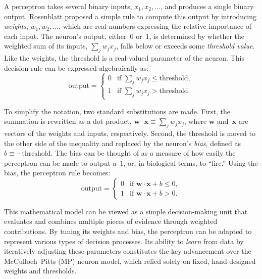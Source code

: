 A perceptron takes several binary inputs, $x_1, x_2, \dots$, and produces a
single binary output.
Rosenblatt proposed a simple rule to compute this output by introducing
\textit{weights}, $w_1, w_2, \dots$, which are real numbers expressing the
relative importance of each input.
The neuron's output, either~$0$ or~$1$, is determined by whether the weighted
sum of its inputs, $\sum_j w_j x_j$, falls below or exceeds some
\textit{threshold value}.
Like the weights, the threshold is a real-valued parameter of the neuron.
This decision rule can be expressed algebraically as:
\begin{equation}
\label{eq:perceptron-threshold}
\text{output} = 
\begin{cases} 
0 & \text{if } \sum_j w_j x_j \le \text{threshold}, \\ 
1 & \text{if } \sum_j w_j x_j > \text{threshold}. 
\end{cases}
\end{equation}

To simplify the notation, two standard substitutions are made.
First, the summation is rewritten as a dot product,
$\mathbf{w} \cdot \mathbf{x} \equiv \sum_j w_j x_j$, where $\mathbf{w}$
and~$\mathbf{x}$ are vectors of the weights and inputs, respectively.
Second, the threshold is moved to the other side of the inequality and
replaced by the neuron's \textit{bias}, defined as
$b \equiv -\text{threshold}$.
The bias can be thought of as a measure of how easily the perceptron can be
made to output a~$1$, or, in biological terms, to ``fire.''
Using the bias, the perceptron rule becomes:
\begin{equation}
\label{eq:perceptron-bias}
\text{output} = 
\begin{cases} 
0 & \text{if } \mathbf{w} \cdot \mathbf{x} + b \le 0, \\ 
1 & \text{if } \mathbf{w} \cdot \mathbf{x} + b > 0. 
\end{cases}
\end{equation}

This mathematical model can be viewed as a simple decision-making unit that
evaluates and combines multiple pieces of evidence through weighted
contributions.
By tuning its weights and bias, the perceptron can be adapted to represent
various types of decision processes.
Its ability to \emph{learn} from data by iteratively adjusting these
parameters constitutes the key advancement over the McCulloch--Pitts (MP)
neuron model, which relied solely on fixed, hand-designed weights and
thresholds.


